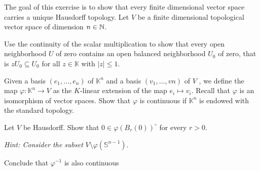 \begin{Problem}
	The goal of this exercise is to show that every finite dimensional vector space carries a unique Hausdorff
	topology. Let $V$ be a finite dimensional topological vector space of dimension $n\in \mathbb{N}$.
	\begin{parts}
		\item Use the continuity of the scalar multiplication to show that every open neighborhood $U$ of zero contains an open balanced neighborhood $U_0$ of zero, that is $zU_0 \subseteq U_0$ for all $z \in \mathbb{K}$	with $|z| \le 1$.
		\item Given a basis $(e_1, \dots , e_n)$ of $\mathbb{K}^n$ and a basis $(v_1, \dots , vn)$ of $V$ , we define the map
		$\varphi: \mathbb{K}^n \to V$ as the $K$-linear extension of the map $e_i\mapsto v_i$. Recall that $\varphi$ is an isomorphism of vector spaces. Show that $\varphi$ is continuous if $\mathbb{K}^n$ is endowed with the standard topology.
		\item Let $V$ be Hausdorff. Show that $0 \in \varphi(B_r(0))^{\circ}$ for every $r > 0$.
		
			\emph{Hint: Consider the subset} $V\setminus \varphi(\mathbb{S}^{n-1})$.
		
		\item Conclude that $\varphi^{-1}$ is also continuous
	\end{parts}
\end{Problem}


